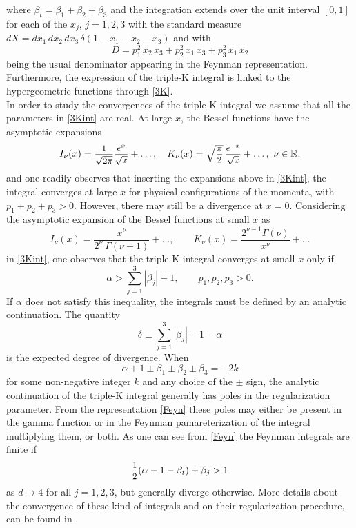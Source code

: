 \documentclass[a4paper,11pt,openright,twoside]{book}
\let\a=\alpha   \let\b=\beta   \let\g=\gamma   \let\d=\delta
\let\n=\nu      \let\x=\xi     \let\p=\pi      \let\r=\rho
\newcommand{\sdfrac}[2]{\mbox{\small$\displaystyle\frac{#1}{#2}$}}
\numberwithin{equation}{section}
\begin{document}
{{{\begin{equation}
\end{equation}
where $\b_t=\b_1+\b_2+\b_3$ and the integration extends over the unit interval $[0,1]$ for each of the $x_j$, $j=1,2,3$ with the standard measure $dX=dx_1\,dx_2\,dx_3\,\d(1-x_1-x_2-x_3)$ and with
\begin{equation}
	D=p_1^2\,x_2\,x_3+p_2^2\,x_1\,x_3+p_3^2\,x_1\,x_2
\end{equation}
being the usual denominator appearing in the Feynman representation. Furthermore, the expression of the triple-K integral is linked to the hypergeometric functions through \eqref{3K}. \\
In order to study the convergences of the triple-K integral we assume that all the parameters in \eqref{3Kint} are real. At large $x$, the Bessel functions have the asymptotic expansions
\begin{equation}
	I_\n(x)=\sdfrac{1}{\sqrt{2\pi}}\sdfrac{e^x}{\sqrt{x}}+\dots,\quad K_\n(x)=\sqrt{\sdfrac{\pi}{2}}\,\sdfrac{e^{-x}}{\sqrt{x}}+\dots,\ \n\in\mathbb R, 
\end{equation}
and one readily observes that  inserting the expansions above in \eqref{3Kint}, the integral converges at large $x$ for physical configurations of the momenta, with $p_1+p_2+p_3>0$. However, there may still be a divergence at $x=0$. Considering the asymptotic expansion of the Bessel functions at small $x$ as
\begin{equation}
	I_{\nu}(x)=\frac{x^\nu}{2^\nu\ \Gamma(\nu+1)}+\dots,\qquad K_\nu(x)= \frac{2^{\nu-1}\Gamma(\nu)}{x^\nu}+\dots
\end{equation}
in \eqref{3Kint}, one observes that the triple-K integral converges at small $x$ only if
\begin{equation}
	\a>\sum_{j=1}^{3}|\b_j|+1,\qquad p_1,p_2,p_3>0.\label{region}
\end{equation}
If $\a$ does not satisfy this inequality, the integrals must be defined by an analytic continuation. The quantity
\begin{equation}
	\d\equiv \sum_{j=1}^3|\b_j| -1-\a
\end{equation}
is the expected degree of divergence. When
\begin{equation}
	\a+1\pm\b_1\pm\b_2\pm\b_3=-2k\label{condition}
\end{equation}
for some non-negative integer $k$ and any choice of the $\pm$ sign, the analytic continuation of the triple-K integral generally has poles in the regularization parameter. From the representation \eqref{Feyn} these poles may either be present in the gamma function or in the Feynman pamareterization of the integral multiplying them, or both. As one can see from \eqref{Feyn} the Feynman integrals are finite if
\begin{equation}
	\sdfrac{1}{2}(\a-1-\b_t)+\b_j>1
\end{equation}
as $d\to4$ for all $j=1,2,3$, but generally diverge otherwise. 
More details about the convergence of these kind of integrals and on their regularization procedure, can be found in \cite{Bzowski:2014qja,Bzowski:2015yxv, Bzowski:2018fql, Bzowski:2015pba}.
}}}
\end{document}
